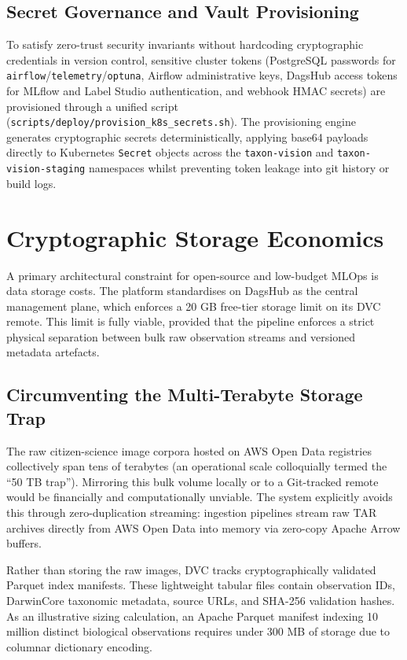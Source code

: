 \subsection{Secret Governance and Vault Provisioning}
\label{sec:secret_governance}

To satisfy zero-trust security invariants without hardcoding cryptographic credentials in version control, sensitive cluster tokens (PostgreSQL passwords for \texttt{airflow}/\texttt{telemetry}/\texttt{optuna}, Airflow administrative keys, DagsHub access tokens for MLflow and Label Studio authentication, and webhook HMAC secrets) are provisioned through a unified script (\nolinkurl{scripts/deploy/provision_k8s_secrets.sh}). The provisioning engine generates cryptographic secrets deterministically, applying base64 payloads directly to Kubernetes \texttt{Secret} objects across the \texttt{taxon-vision} and \texttt{taxon-vision-staging} namespaces whilst preventing token leakage into git history or build logs.

\section{Cryptographic Storage Economics}
A primary architectural constraint for open-source and low-budget MLOps is data storage costs. The platform standardises on DagsHub as the central management plane, which enforces a 20 GB free-tier storage limit on its DVC remote. This limit is fully viable, provided that the pipeline enforces a strict physical separation between bulk raw observation streams and versioned metadata artefacts.

\subsection{Circumventing the Multi-Terabyte Storage Trap}
The raw citizen-science image corpora hosted on AWS Open Data registries collectively span tens of terabytes (an operational scale colloquially termed the ``50 TB trap''). Mirroring this bulk volume locally or to a Git-tracked remote would be financially and computationally unviable. The system explicitly avoids this through zero-duplication streaming: ingestion pipelines stream raw TAR archives directly from AWS Open Data into memory via zero-copy Apache Arrow buffers.

Rather than storing the raw images, DVC tracks cryptographically validated Parquet index manifests. These lightweight tabular files contain observation IDs, DarwinCore taxonomic metadata, source URLs, and SHA-256 validation hashes. As an illustrative sizing calculation, an Apache Parquet manifest indexing 10 million distinct biological observations requires under 300 MB of storage due to columnar dictionary encoding.

